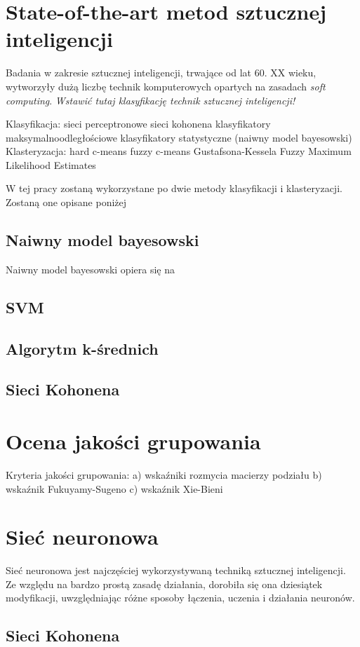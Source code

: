 \documentclass[12pt,a4paper,oneside]{report} %
\begin{document}
\section{State-of-the-art metod sztucznej inteligencji}
Badania w zakresie sztucznej inteligencji, trwające od lat 60. XX wieku, wytworzyły dużą liczbę technik komputerowych opartych na zasadach \emph{soft computing}. \emph{Wstawić tutaj klasyfikację technik sztucznej inteligencji!}\par

Klasyfikacja:
    sieci perceptronowe
    sieci kohonena
    klasyfikatory maksymalnoodległościowe
    klasyfikatory statystyczne (naiwny model bayesowski)
Klasteryzacja:
    hard c-means
    fuzzy c-means
    Gustafsona-Kessela
    Fuzzy Maximum Likelihood Estimates

W tej pracy zostaną wykorzystane po dwie metody klasyfikacji i klasteryzacji. Zostaną one opisane poniżej

\subsection{Naiwny model bayesowski}
Naiwny model bayesowski opiera się na
\subsection{SVM}
\subsection{Algorytm k-średnich}
\subsection{Sieci Kohonena}

\section{Ocena jakości grupowania}
Kryteria jakości grupowania:
    a) wskaźniki rozmycia macierzy podziału
    b) wskaźnik Fukuyamy-Sugeno
    c) wskaźnik Xie-Bieni
\section{Sieć neuronowa}
Sieć neuronowa jest najczęściej wykorzystywaną techniką sztucznej inteligencji. Ze względu na bardzo prostą zasadę działania, dorobiła się ona dziesiątek modyfikacji, uwzględniając różne sposoby łączenia, uczenia i działania neuronów.
\subsection{Sieci Kohonena}
\end{document}
